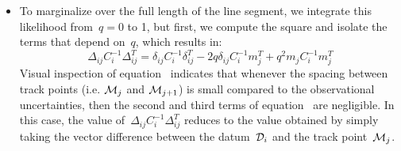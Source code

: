 \documentclass[ms.tex]{subfiles}
\begin{document}
\begin{itemize}
	\item To marginalize over the full length of the line segment, we integrate
	this likelihood from~$q = 0$ to 1, but first, we compute the square and
	isolate the terms that depend on~$q$, which results in:
	\begin{equation}
	\label{eq:chi_squared_ij}
	\Delta_{ij}C_i^{-1}\Delta_{ij}^T = 
	\delta_{ij}C_i^{-1}\delta_{ij}^T - 2q \delta_{ij} C_i^{-1} m_j^T +
	q^2 m_j C_i^{-1} m_j^T
	\end{equation}
	Visual inspection of equation~ indicates that
	whenever the spacing between track points (i.e. $\mathcal{M}_{j}$ and
	$\mathcal{M}_{j + 1}$) is small compared to the observational uncertainties,
	then the second and third terms of equation~ are
	negligible.
	In this case, the value of~$\Delta_{ij}C_i^{-1}\Delta_{ij}^T$ reduces to
	the value obtained by simply taking the vector difference between the
	datum~$\mathcal{D}_i$ and the track point~$\mathcal{M}_j$.


\end{itemize}
\end{document}

